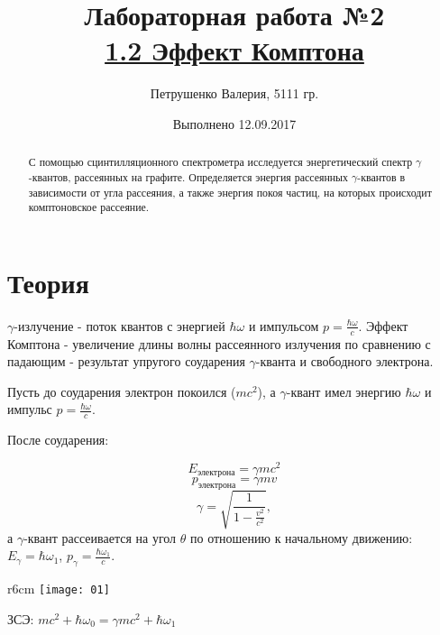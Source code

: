 \documentclass[letterpaper,12pt]{article}
\begin{document}
	
	\title{\textbf{Лабораторная работа №2}\vspace{3mm} \\ \underline{1.2 Эффект Комптона}}
	\author{Петрушенко Валерия, 5111 гр.}
	\date{Выполнено 12.09.2017}
	\maketitle
	\renewcommand{\abstractname}{\vspace{-\baselineskip}}
	
	\begin{abstract}
		С помощью сцинтилляционного спектрометра исследуется энергетический спектр $\gamma$-квантов, рассеянных на графите. Определяется энергия рассеянных  $\gamma$-квантов в зависимости от угла рассеяния, а также энергия покоя частиц, на которых происходит комптоновское рассеяние.
		
	\end{abstract}
	
	
	\section{Теория}

	$\gamma$-излучение - поток квантов с энергией $\hbar\omega$ и импульсом $p=\frac{\hbar\omega}{c}$.   Эффект Комптона - увеличение длины волны рассеянного излучения по сравнению с падающим - результат упругого соударения $\gamma$-кванта и свободного электрона.
	
		Пусть до соударения электрон покоился ($mc^2$), а $\gamma$-квант имел энергию $\hbar\omega$ и импульс $p=\frac{\hbar\omega}{c}$.
		
		\vspace{3mm}
			После соударения:
			
	\begin{equation*}
	E_\text{электрона}=\gamma mc^2
	\end{equation*}
	\begin{equation*}
	p_\text{электрона}=\gamma mv
	\end{equation*}
	\begin{equation*}
	\gamma=\sqrt{\dfrac{1}{1-\frac{v^2}{c^2}}},
	\end{equation*}
	а $\gamma$-квант рассеивается на угол  $\theta$  по отношению к начальному движению:   $E_\gamma=\hbar\omega_1$, $p_\gamma=\frac{\hbar\omega_1}{c}$.
	
	
	\begin{wrapfigure}[5]{r}{6cm} 
		\vspace{-1cm}
	{\texttt{[image: 01]}}
	 \end{wrapfigure}
	\vspace{0.3cm}
	ЗСЭ: $mc^2+\hbar \omega_0=\gamma mc^2+\hbar \omega_1$	
	\vspace{0.3cm}
	
\end{document}
